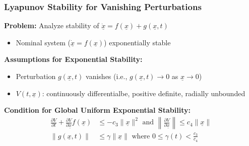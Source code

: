 \documentclass[student, noshadow, lsr, english, aspectratio=169, t]{ITR_LSR_slides}
\begin{document}
\begin{frame}
    \frametitle{Lyapunov Stability for Vanishing Perturbations}

    \textbf{Problem:} Analyze stability of $\dot{\underline{x}} = f(\underline{x}) + g(\underline{x}, t)$
    \begin{itemize}
        \item Nominal system ($\dot{\underline{x}} = f(\underline{x})$) exponentially stable
    \end{itemize}
	\vspace{0.3cm}
    \textbf{Assumptions for Exponential Stability:}
    \begin{itemize}
        \item Perturbation $g(\underline{x}, t)$ vanishes (i.e., $g(\underline{x}, t) \to 0$ as $\underline{x} \to 0$)
        \item $V(t,\underline{x})$: continuously differentialbe, positive definite, radially unbounded
    \end{itemize}
    \vspace{0.3cm} %
    \textbf{Condition for Global Uniform Exponential Stability:}
    \begin{align*}
        \frac{\partial V}{\partial t}+\frac{\partial V}{\partial \underline{x}}f(\underline{x}) &\leq -c_3\|\underline{x}\|^2 \text{ and } \left\|\frac{\partial V}{\partial \underline{x}}\right\| \leq c_4\|\underline{x}\| \\[0.5em]
        \|g(\underline{x},t)\| &\leq \gamma\|\underline{x}\| \text{ where } 0 \leq \gamma(t) < \frac{c_3}{c_4}
    \end{align*}

\end{frame}
\end{document}
